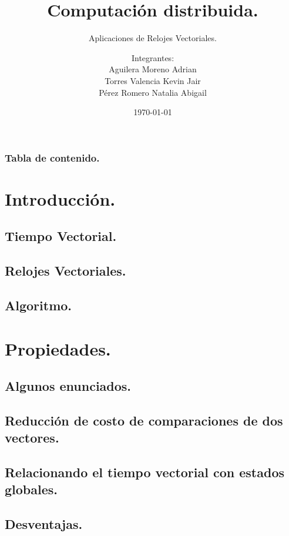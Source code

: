 \documentclass[9pt]{beamer}
\title{Computación distribuida.}
\subtitle{Aplicaciones de Relojes Vectoriales.}
\author{Integrantes:\\
        Aguilera Moreno Adrian\\
        Torres Valencia Kevin Jair\\
        Pérez Romero Natalia Abigail}
\institute{Facultad de Ciencias, UNAM}
\date{\today}
\begin{document}
\titlepage

\begin{frame}
 \frametitle{Tabla de contenido.}
 \tableofcontents
\end{frame}

\section{Introducción.}
\subsection{Tiempo Vectorial.}


\subsection{Relojes Vectoriales.}

\def\beamer@mytheme@style{green}


\subsection{Algoritmo.}





\section{Propiedades.}

\subsection{Algunos enunciados.}


\subsection{Reducción de costo de comparaciones de dos vectores.}


\subsection{Relacionando el tiempo vectorial con estados globales.}


\subsection{Desventajas.}



\end{document}
